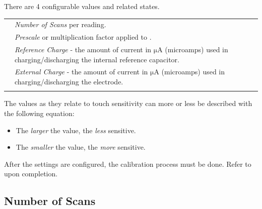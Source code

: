 \par\medskip

There are \num{4} configurable values and related states.

\begin{table}[H]
\begin{tabu} { X[1,c,m] | X[10,l,m] }
  \thrule
   & \textit{Number of Scans} per reading. \\ 
   & \textit{Prescale} or multiplication factor applied to
    . \\ 
   & \textit{Reference Charge} - the amount of current in
    $\mathrm{\mu A}$ (microamps) used in charging/discharging the internal
    reference capacitor. \\ 
   & \textit{External Charge} - the amount of current in
    $\mathrm{\mu A}$ (microamps) used in charging/discharging the electrode. \\
  \bhrule
\end{tabu}
\end{table}

The values as they relate to touch sensitivity can more or less be described
with the following equation:


\begin{itemize}[leftmargin=*,label=\guilsinglright]
  \item The \textit{larger} the value, the \textit{less} sensitive.
  \item The \textit{smaller} the value, the \textit{more} sensitive.
\end{itemize}

After the settings are configured, the calibration process must be done. Refer
to \hyperref[Touch Calibration]{} upon completion.

\subsection{Number of Scans} 

